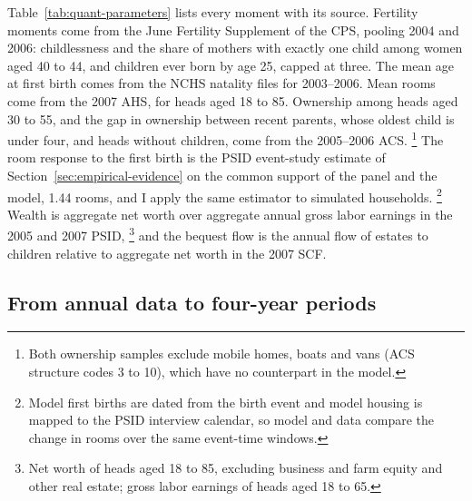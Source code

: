 Table~\ref{tab:quant-parameters} lists every moment with its source.
Fertility moments come from the June Fertility Supplement of the CPS, pooling
2004 and 2006: childlessness and the share of mothers with exactly one child
among women aged 40 to 44, and children ever born by age 25, capped at three.
The mean age at first birth comes from the NCHS natality files for
2003--2006. Mean rooms come from the 2007 AHS, for heads aged 18 to 85.
Ownership among heads aged 30 to 55, and the gap in ownership between recent
parents, whose oldest child is under four, and heads without children, come
from the 2005--2006 ACS.%
\footnote{Both ownership samples exclude mobile homes, boats and vans (ACS
structure codes 3 to 10), which have no counterpart in the model.}
The room response to the first birth is the PSID event-study estimate of
Section~\ref{sec:empirical-evidence} on the common support of the panel and
the model, 1.44 rooms, and I apply the same estimator to simulated
households.%
\footnote{Model first births are dated from the birth event and model
housing is mapped to the PSID interview calendar, so model and data compare
the change in rooms over the same event-time windows.}
Wealth is aggregate net worth over aggregate annual gross labor earnings in
the 2005 and 2007 PSID,%
\footnote{Net worth of heads aged 18 to 85, excluding business and farm
equity and other real estate; gross labor earnings of heads aged 18 to 65.}
and the bequest flow is the annual flow of estates to children relative to
aggregate net worth in the 2007 SCF.

\subsection{From annual data to four-year periods}
\label{sec:quant-period}

